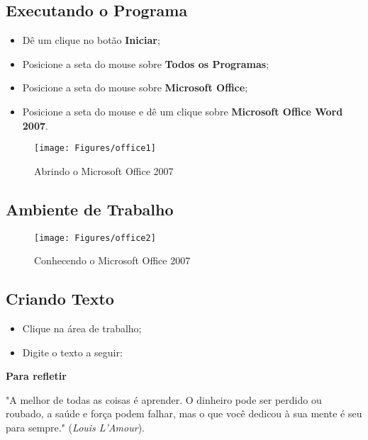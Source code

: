 \documentclass[hidelinks,12pt]{article}
\begin{document}
	\subsection{Executando o Programa}
	
	\begin{itemize}
		\item Dê um clique no botão \textbf {Iniciar};

		\item Posicione a seta do mouse sobre \textbf{Todos os Programas};
		
		\item Posicione a seta do mouse sobre \textbf{Microsoft Office};
		
		\item Posicione a seta do mouse e dê um clique sobre \textbf{Microsoft Office Word 2007}.
		
		
	\end{itemize}
	
	\begin{figure}[!h]
		\centering
		\texttt{[image: Figures/office1]}
		\label{fig:office1}
		\caption{Abrindo o Microsoft Office 2007}
	\end{figure}
			
	\newpage		
	\subsection{Ambiente de Trabalho}
		
		\begin{figure}[!h]
			\centering
			\texttt{[image: Figures/office2]}
			\label{fig:office2}
			\caption{Conhecendo o Microsoft Office 2007}
		\end{figure}
				
	\subsection{Criando Texto}

		
		\begin{itemize}
			\item Clique na área de trabalho;
			
			\item Digite o texto a seguir:
		\end{itemize}
		
		
		{\textbf{\hspace{5cm} Para refletir}}
		
		"A melhor de todas as coisas é aprender. O dinheiro pode ser perdido ou roubado, a saúde e força podem falhar, mas o que você dedicou à sua mente é seu para sempre." (\emph{Louis L'Amour}).
		
\end{document}

